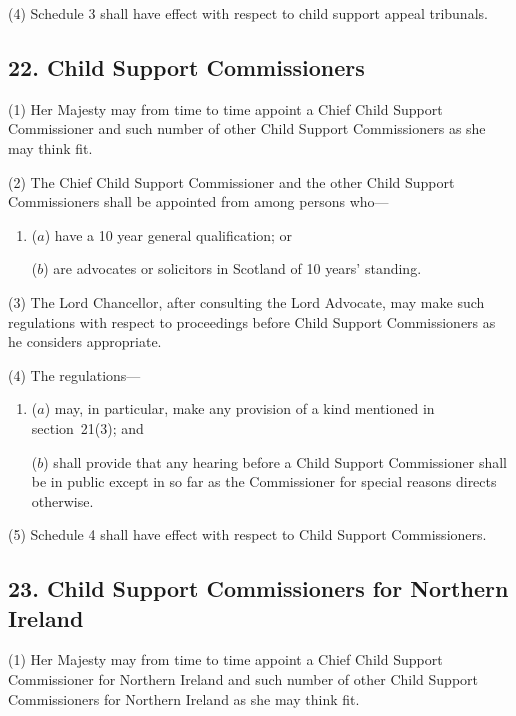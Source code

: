 \documentclass[12pt,a4paper]{article}
\begin{document}
(4) Schedule 3 shall have effect with respect to child support appeal tribunals.


\subsection{22. Child Support Commissioners}

(1) Her Majesty may from time to time appoint a Chief Child Support Commissioner and such number of other Child Support Commissioners as she may think fit.

(2) The Chief Child Support Commissioner and the other Child Support Commissioners shall be appointed from among persons who—
\begin{enumerate}\item[]
($a$) have a 10 year general qualification; or

($b$) are advocates or solicitors in Scotland of 10 years' standing.
\end{enumerate}

(3) The Lord Chancellor, after consulting the Lord Advocate, may make such regulations with respect to proceedings before Child Support Commissioners as he considers appropriate.

(4) The regulations—
\begin{enumerate}\item[]
($a$) may, in particular, make any provision of a kind mentioned in section~21(3); and

($b$) shall provide that any hearing before a Child Support Commissioner shall be in public except in so far as the Commissioner for special reasons directs otherwise.
\end{enumerate}

(5) Schedule 4 shall have effect with respect to Child Support Commissioners.


\subsection{23. Child Support Commissioners for Northern Ireland}

(1) Her Majesty may from time to time appoint a Chief Child Support Commissioner for Northern Ireland and such number of other Child Support Commissioners for Northern Ireland as she may think fit.
\end{document}
